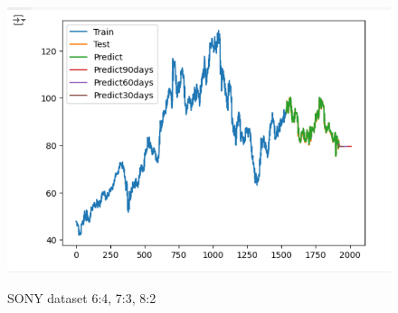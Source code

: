 \documentclass[conference]{IEEEtran}
\begin{document}
\begin{figure}[H]
\begin{minipage}{0.15\textwidth}
    \label{fig:2}
    \end{minipage}%
    \begin{minipage}{0.15\textwidth}
    \centering
    \includegraphics[width=1\textwidth]{Image/GradientBoosting/SONY_8_2_GradientBoostingRegressor.png}

    \label{fig:3}
    \end{minipage}
    \caption{SONY dataset 6:4, 7:3, 8:2}
\end{figure}
\end{document}
